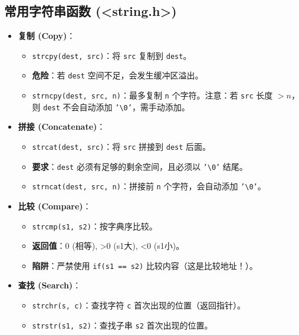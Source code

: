 \documentclass[a4paper,12pt]{article}
\begin{document}
\subsection{常用字符串函数 (<string.h>)}
\begin{itemize}
    \item \textbf{复制 (Copy)}：
    \begin{itemize}
        \item \texttt{strcpy(dest, src)}：将 \texttt{src} 复制到 \texttt{dest}。
        \item \textbf{危险}：若 \texttt{dest} 空间不足，会发生缓冲区溢出。
        \item \texttt{strncpy(dest, src, n)}：最多复制 \texttt{n} 个字符。注意：若 \texttt{src} 长度 $> n$，则 \texttt{dest} 不会自动添加 \texttt{'\textbackslash 0'}，需手动添加。
    \end{itemize}
    
    \item \textbf{拼接 (Concatenate)}：
    \begin{itemize}
        \item \texttt{strcat(dest, src)}：将 \texttt{src} 拼接到 \texttt{dest} 后面。
        \item \textbf{要求}：\texttt{dest} 必须有足够的剩余空间，且必须以 \texttt{'\textbackslash 0'} 结尾。
        \item \texttt{strncat(dest, src, n)}：拼接前 \texttt{n} 个字符，会自动添加 \texttt{'\textbackslash 0'}。
    \end{itemize}
    
    \item \textbf{比较 (Compare)}：
    \begin{itemize}
        \item \texttt{strcmp(s1, s2)}：按字典序比较。
        \item \textbf{返回值}：0 (相等), >0 (s1大), <0 (s1小)。
        \item \textbf{陷阱}：严禁使用 \texttt{if(s1 == s2)} 比较内容（这是比较地址！）。
    \end{itemize}
    
    \item \textbf{查找 (Search)}：
    \begin{itemize}
        \item \texttt{strchr(s, c)}：查找字符 \texttt{c} 首次出现的位置（返回指针）。
        \item \texttt{strstr(s1, s2)}：查找子串 \texttt{s2} 首次出现的位置。
    \end{itemize}
\end{itemize}
\end{document}
